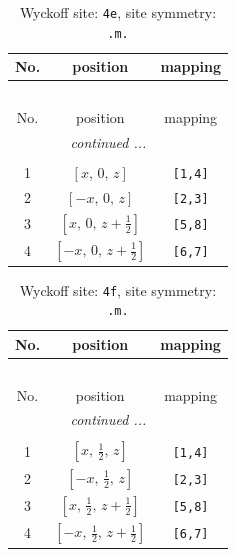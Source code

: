 \documentclass[fleqn,8pt]{jsarticle}
\begin{document}
\begin{longtable}{ccc}
\caption{Wyckoff site: {\tt 4e}, site symmetry: {\tt .m.}}
 \\
 \hline \hline
No. & position & mapping \\ \hline \endfirsthead

\multicolumn{2}{l}{\tablename\ \thetable{}} \\
 \hline \hline
No. & position & mapping \\ \hline \endhead

 \hline \hline
\multicolumn{2}{r}{\footnotesize\it continued ...} \\ \endfoot

 \hline \hline
\multicolumn{2}{r}{} \\ \endlastfoot

1 & $\left[ x,\, 0,\, z \right]$ & {\tt [1,4]} \\ \hline
2 & $\left[ - x,\, 0,\, z \right]$ & {\tt [2,3]} \\ \hline
3 & $\left[ x,\, 0,\, z + \frac{1}{2} \right]$ & {\tt [5,8]} \\ \hline
4 & $\left[ - x,\, 0,\, z + \frac{1}{2} \right]$ & {\tt [6,7]} \\
\end{longtable}
\renewcommand{\arraystretch}{1.2}
\begin{longtable}{ccc}
\caption{Wyckoff site: {\tt 4f}, site symmetry: {\tt .m.}}
 \\
 \hline \hline
No. & position & mapping \\ \hline \endfirsthead

\multicolumn{2}{l}{\tablename\ \thetable{}} \\
 \hline \hline
No. & position & mapping \\ \hline \endhead

 \hline \hline
\multicolumn{2}{r}{\footnotesize\it continued ...} \\ \endfoot

 \hline \hline
\multicolumn{2}{r}{} \\ \endlastfoot

1 & $\left[ x,\, \frac{1}{2},\, z \right]$ & {\tt [1,4]} \\ \hline
2 & $\left[ - x,\, \frac{1}{2},\, z \right]$ & {\tt [2,3]} \\ \hline
3 & $\left[ x,\, \frac{1}{2},\, z + \frac{1}{2} \right]$ & {\tt [5,8]} \\ \hline
4 & $\left[ - x,\, \frac{1}{2},\, z + \frac{1}{2} \right]$ & {\tt [6,7]} \\
\end{longtable}
\end{document}
